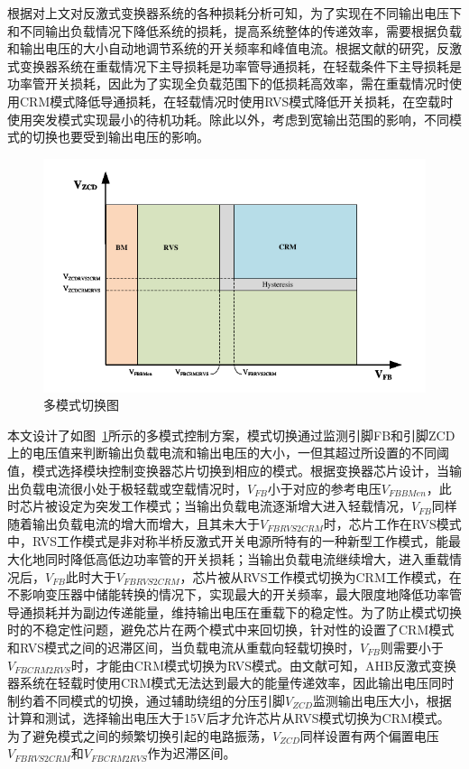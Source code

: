 根据对上文对反激式变换器系统的各种损耗分析可知，为了实现在不同输出电压下和不同输出负载情况下降低系统的损耗，提高系统整体的传递效率，需要根据负载和输出电压的大小自动地调节系统的开关频率和峰值电流。根据文献的研究，反激式变换器系统在重载情况下主导损耗是功率管导通损耗，在轻载条件下主导损耗是功率管开关损耗，因此为了实现全负载范围下的低损耗高效率，需在重载情况时使用CRM模式降低导通损耗，在轻载情况时使用RVS模式降低开关损耗，在空载时使用突发模式实现最小的待机功耗。除此以外，考虑到宽输出范围的影响，不同模式的切换也要受到输出电压的影响。

\begin{figure}[htbp] 
    \centering
    \includegraphics[width=0.8\linewidth]{figures/模式切换1.pdf}
    \caption{多模式切换图}
    \label{fig:模式切换1}
\end{figure}

本文设计了如图~\ref{fig:模式切换1}所示的多模式控制方案，模式切换通过监测引脚FB和引脚ZCD上的电压值来判断输出负载电流和输出电压的大小，一但其超过所设置的不同阈值，模式选择模块控制变换器芯片切换到相应的模式。根据变换器芯片设计，当输出负载电流很小处于极轻载或空载情况时，$V_{FB}$小于对应的参考电压$V_{FBBMen}$，此时芯片被设定为突发工作模式；当输出负载电流逐渐增大进入轻载情况，$V_{FB}$同样随着输出负载电流的增大而增大，且其未大于$V_{FBRVS2CRM}$时，芯片工作在RVS模式中，RVS工作模式是非对称半桥反激式开关电源所特有的一种新型工作模式，能最大化地同时降低高低边功率管的开关损耗；当输出负载电流继续增大，进入重载情况后，$V_{FB}$此时大于$V_{FBRVS2CRM}$，芯片被从RVS工作模式切换为CRM工作模式，在不影响变压器中储能转换的情况下，实现最大的开关频率，最大限度地降低功率管导通损耗并为副边传递能量，维持输出电压在重载下的稳定性。为了防止模式切换时的不稳定性问题，避免芯片在两个模式中来回切换，针对性的设置了CRM模式和RVS模式之间的迟滞区间，当负载电流从重载向轻载切换时，$V_{FB}$则需要小于$V_{FBCRM2RVS}$时，才能由CRM模式切换为RVS模式。由文献可知，AHB反激式变换器系统在轻载时使用CRM模式无法达到最大的能量传递效率，因此输出电压同时制约着不同模式的切换，通过辅助绕组的分压引脚$V_{ZCD}$监测输出电压大小，根据计算和测试，选择输出电压大于15V后才允许芯片从RVS模式切换为CRM模式。为了避免模式之间的频繁切换引起的电路振荡，$V_{ZCD}$同样设置有两个偏置电压$V_{FBRVS2CRM}$和$V_{FBCRM2RVS}$作为迟滞区间。

